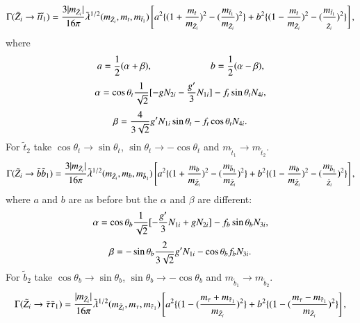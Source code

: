 \documentclass[final,3p,times]{elsarticle}
\begin{document}
\begin{equation}\label{neuttst1}
\Gamma (\tilde{Z}_i \rightarrow \bar{t} \tilde{t}_{1}) = {3 |m_{\tilde{Z}_i}| \over 16\pi} \tilde{\lambda}^{1/2} (m_{\tilde{Z}_i}, m_t, m_{\tilde{t}_{1}}) \left[a^2\{(1+{m_t \over m_{\tilde{Z}_i}})^2 - ({m_{\tilde{t}_1} \over m_{\tilde{Z}_i}})^2\} + b^2\{(1-{m_t \over m_{\tilde{Z}_i}})^2 - ({m_{\tilde{t}_1} \over _{\tilde{Z}_i}})^2\}\right],
\end{equation} 
where
\begin{equation}
a = {1 \over 2}(\alpha+\beta), \:  \:   \: \: \:  \: \:\:  \: \: \:  \: \: \:  \: \: \:  \: \: \:  \: \: \:  \: \: \: \:  b = {1 \over 2}(\alpha-\beta),
\end{equation}
\begin{equation}
\alpha = \cos \theta_t {1 \over \sqrt{2}} [-g N_{2i} - {g' \over 3} N_{1i}] - f_t \sin \theta_t N_{4i},
\end{equation}
\begin{equation}
\beta = {4 \over 3\sqrt{2}} g' N_{1i} \sin \theta_t - f_t \cos \theta_t N_{4i}.
\end{equation}
For $\tilde{t}_2$ take $\cos\theta_t \rightarrow \sin\theta_t$, $\sin\theta_t \rightarrow -\cos\theta_t$ and $m_{\tilde{t}_1} \rightarrow m_{\tilde{t}_2}$.
\begin{equation}\label{neutbsb1}
\Gamma (\tilde{Z}_i \rightarrow \bar{b} \tilde{b}_{1}) = {3 |m_{\tilde{Z}_i}| \over 16\pi} \tilde{\lambda}^{1/2} (m_{\tilde{Z}_i}, m_b, m_{\tilde{b}_{1}}) \left[a^2\{(1+{m_b \over m_{\tilde{Z}_i}})^2 - ({m_{\tilde{b}_1} \over m_{\tilde{Z}_i}})^2\} + b^2\{(1-{m_b \over m_{\tilde{Z}_i}})^2 - ({m_{\tilde{b}_1} \over _{\tilde{Z}_i}})^2\}\right],
\end{equation} 
where $a$ and $b$ are as before but the $\alpha$ and $\beta$ are different:
\begin{equation}
\alpha = \cos \theta_b {1 \over \sqrt{2}} [-{g' \over 3} N_{1i} + g N_{2i}] - f_b \sin \theta_b N_{3i},
\end{equation}
\begin{equation}
\beta = -\sin \theta_b {2 \over 3\sqrt{2}}g' N_{1i}  - \cos \theta_b f_b N_{3i}.
\end{equation}
For $\tilde{b}_2$ take $\cos\theta_b \rightarrow \sin\theta_b$, $\sin\theta_b \rightarrow -\cos\theta_b$ and 	$m_{\tilde{b}_1} \rightarrow m_{\tilde{b}_2}$.
\begin{equation}\label{neuttaustau1}
\Gamma (\tilde{Z}_i \rightarrow \bar{\tau} \tilde{\tau}_{1}) = {|m_{\tilde{Z}_i}| \over 16\pi} \tilde{\lambda}^{1/2} (m_{\tilde{Z}_i}, m_\tau, m_{\tilde{\tau}_{1}}) \left[ a^2\{(1-({m_\tau + m_{\tilde{\tau}_1} \over m_{\tilde{Z}_i}})^2\} + b^2\{(1-({m_\tau - m_{\tilde{\tau}_1} \over m_{\tilde{Z}_i}})^2\} \right],
\end{equation} 
\end{document}
